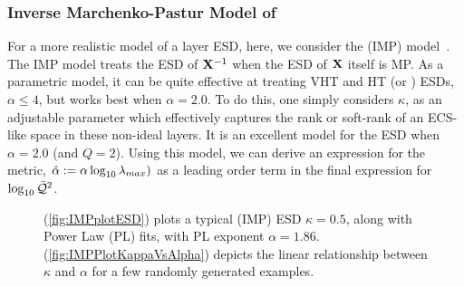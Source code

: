\subsubsection{Inverse Marchenko-Pastur Model of \IdealLearning}
For a more realistic model of a layer ESD, 
here, we consider the \InverseMP (IMP) model~\cite{BunThesis}.
The IMP model treats the ESD of $\mathbf{X}^{-1}$ when the ESD of $\mathbf{X}$ itself is MP.
As a parametric model, it can be quite effective at treating VHT and HT (or \FatTailed) ESDs,
$\alpha\le 4$, but works best when $\alpha=2.0$.
To do this, one simply considers  $\kappa$,  as an adjustable parameter which effectively captures the rank or soft-rank of an ECS-like space in these non-ideal layers.
%
It is an excellent model for the ESD when $\alpha=2.0$ (and $Q=2$).
Using this model, we can derive an expression for the \HTSR \ALPHAHAT \LayerQuality metric,
$\hat\alpha :=\alpha\log_{10}\lambda_{max})$ as a leading order term in the final expression for $\log_{10}\bar{\mathcal{Q}}^{2}$.

\begin{figure}[ht]
    \centering
    \caption{
      (\ref{fig:IMPplotESD}) plots a typical \InverseMP (IMP) ESD  $\kappa=0.5$,  along with Power Law (PL) fits, with PL exponent $\alpha=1.86$.
      (\ref{fig:IMPPlotKappaVsAlpha}) depicts the linear relationship between $\kappa$ and $\alpha$ for a few randomly generated examples.
    }
  \label{fig:IMPplots}                                                                                                      
\end{figure}   

